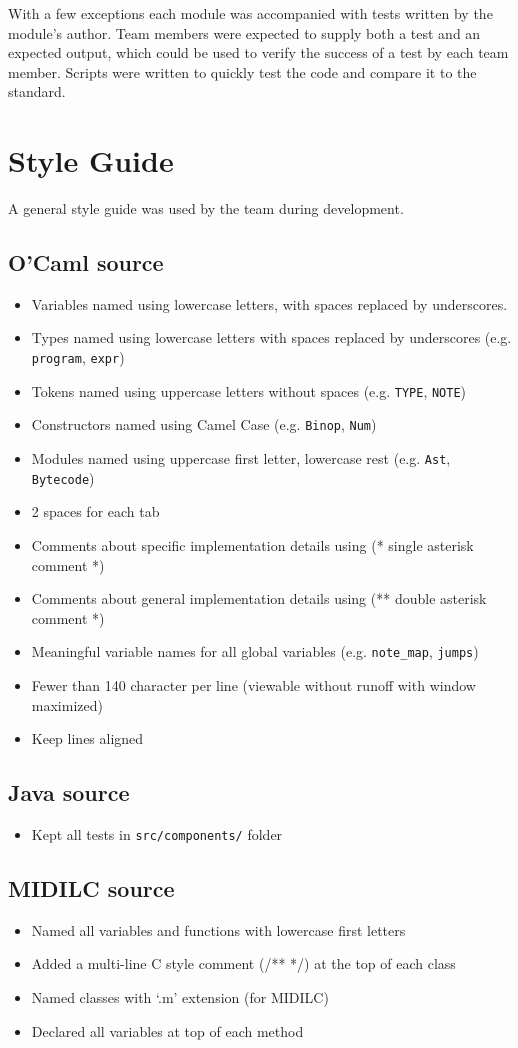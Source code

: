 \documentclass[12pt,A4]{book}
\begin{document}
With a few exceptions each module was accompanied with tests written by the module's author. Team members were expected to supply both a test and an expected output, which could be used to verify the success of a test by each team member. Scripts were written to quickly test the code and compare it to the standard.
\section{Style Guide}
A general style guide was used by the team during development.
\subsection{O'Caml source}
\begin{itemize}
\item Variables named using lowercase letters, with spaces replaced by underscores.
\item Types named using lowercase letters with spaces replaced by underscores (e.g. \verb|program|, \verb|expr|)
\item Tokens named using uppercase letters without spaces (e.g. \verb|TYPE|, \verb|NOTE|)
\item Constructors named using Camel Case (e.g. \verb|Binop|, \verb|Num|)
\item Modules named using uppercase first letter, lowercase rest (e.g. \verb|Ast|, \verb|Bytecode|)
\item 2 spaces for each tab
\item Comments about specific implementation details using (* single asterisk comment *)
\item Comments about general implementation details using (** double asterisk comment *)
\item Meaningful variable names for all global variables (e.g. \verb|note_map|, \verb|jumps|)
\item Fewer than 140 character per line (viewable without runoff with window maximized)
\item Keep lines aligned
\end{itemize}
\subsection{Java source}
\begin{itemize}
\item Kept all tests in \verb|src/components/| folder
\end{itemize}
\subsection{MIDILC source}
\begin{itemize}
\item Named all variables and functions with lowercase first letters
\item Added a multi-line C style comment (/** */) at the top of each class
\item Named classes with `.m' extension (for MIDILC)
\item Declared all variables at top of each method
\end{itemize}
\end{document}
